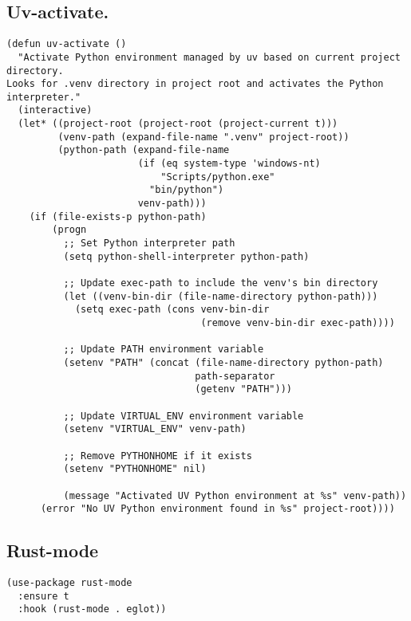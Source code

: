 \documentclass[11pt]{article}
\begin{document}
\subsection{Uv-activate.}
\label{sec:org58347f5}
\begin{verbatim}
(defun uv-activate ()
  "Activate Python environment managed by uv based on current project directory.
Looks for .venv directory in project root and activates the Python interpreter."
  (interactive)
  (let* ((project-root (project-root (project-current t)))
         (venv-path (expand-file-name ".venv" project-root))
         (python-path (expand-file-name
                       (if (eq system-type 'windows-nt)
                           "Scripts/python.exe"
                         "bin/python")
                       venv-path)))
    (if (file-exists-p python-path)
        (progn
          ;; Set Python interpreter path
          (setq python-shell-interpreter python-path)

          ;; Update exec-path to include the venv's bin directory
          (let ((venv-bin-dir (file-name-directory python-path)))
            (setq exec-path (cons venv-bin-dir
                                  (remove venv-bin-dir exec-path))))

          ;; Update PATH environment variable
          (setenv "PATH" (concat (file-name-directory python-path)
                                 path-separator
                                 (getenv "PATH")))

          ;; Update VIRTUAL_ENV environment variable
          (setenv "VIRTUAL_ENV" venv-path)

          ;; Remove PYTHONHOME if it exists
          (setenv "PYTHONHOME" nil)

          (message "Activated UV Python environment at %s" venv-path))
      (error "No UV Python environment found in %s" project-root))))
\end{verbatim}
\subsection{Rust-mode}
\label{sec:orge4d9332}
\begin{verbatim}
(use-package rust-mode
  :ensure t
  :hook (rust-mode . eglot))
\end{verbatim}
\end{document}
